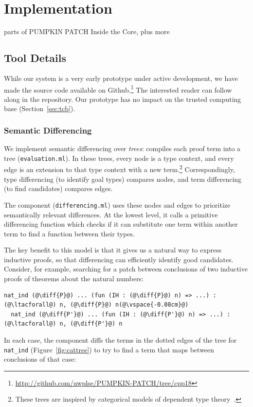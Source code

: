 \section{Implementation}

parts of PUMPKIN PATCH Inside the Core, plus more

\subsection{Tool Details}


While our system is a very early prototype under active development, we have made the source code available on Github.\footnote{\url{http://github.com/uwplse/PUMPKIN-PATCH/tree/cpp18}}
The interested reader can follow along in the repository. %
Our prototype has no impact on the trusted computing base (Section~\ref{sec:tcb}).

\subsubsection{Semantic Differencing} We implement semantic differencing over \emph{trees}:
\sysname compiles each proof term into a tree (\lstinline{evaluation.ml}). In these trees,
every node is a type context, and every edge is an extension to that type context with a 
new term.\footnote{These trees are inspired by categorical models of dependent type theory~\cite{Hofmann97}.}
Correspondingly, type differencing (to identify goal types) compares nodes, 
and term differencing (to find candidates) compares edges. 

The component (\lstinline{differencing.ml}) uses these nodes and edges to prioritize semantically
relevant differences. At the lowest level, it calls a primitive differencing function 
which checks if it can substitute one term within another term to find a function between their types.

The key benefit to this model is that it gives us a natural way to express inductive proofs, so
that differencing can efficiently identify good candidates.
Consider, for example, searching for a patch between conclusions of two inductive proofs of theorems about the natural numbers:

\begin{lstlisting}[language=coq]
  nat_ind (@\diff{P}@) ... (fun (IH : (@\diff{P}@) n) => ...) : (@\ltacforall@) n, (@\diff{P}@) n(@\vspace{-0.08cm}@)
  nat_ind (@\diff{P'}@) ... (fun (IH : (@\diff{P'}@) n) => ...) : (@\ltacforall@) n, (@\diff{P'}@) n
\end{lstlisting}
In each case, the component diffs the terms in the dotted edges of the tree for \lstinline{nat_ind} (Figure~\ref{fig:cattree}) to
try to find a term that maps between conclusions of that case:


